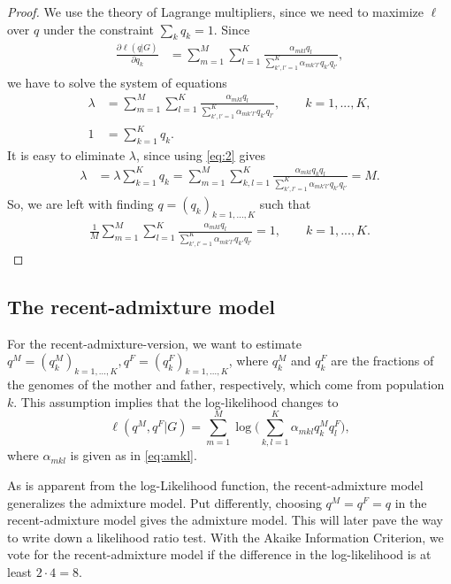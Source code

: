 \documentclass[12pt]{article}
\theoremstyle{definition}
\begin{document}
\begin{proof}
  We use the theory of Lagrange multipliers, since we need to maximize
  $\ell$ over $q$ under the constraint $\sum_k q_k=1$.
  Since
  \begin{align*}
    \frac{\partial \ell(q|G)}{\partial q_k} & = \sum_{m=1}^M \sum_{l=1}^K \frac{\alpha_{mkl}q_l}{\sum_{k',l'=1}^K
                                              \alpha_{mk'l'}q_{k'}q_{l'}},
  \end{align*}
  we have to solve the system of equations
  \begin{align}\label{eq:1}
    \lambda & = \sum_{m=1}^M \sum_{l=1}^K \frac{\alpha_{mkl}q_l}{\sum_{k',l'=1}^K \alpha_{mk'l'}q_{k'}q_{l'}}, \qquad k=1,...,K,
    \\\label{eq:2}
    1 & = \sum_{k=1}^K q_k.
  \end{align}
  It is easy to eliminate $\lambda$, since using \eqref{eq:2} gives
  \begin{align*}
    \lambda & = \lambda \sum_{k=1}^K q_k = \sum_{m=1}^M \sum_{k,l=1}^K
              \frac{\alpha_{mkl}q_kq_l}{\sum_{k',l'=1}^K \alpha_{mk'l'}q_{k'}q_{l'}} = M.
  \end{align*}
  So, we are left with finding $q = (q_k)_{k=1,...,K}$ such that
  \begin{align}\label{eq:1}
    \frac{1}{M}\sum_{m=1}^M \sum_{l=1}^K \frac{\alpha_{mkl}q_l}{\sum_{k',l'=1}^K \alpha_{mk'l'}q_{k'}q_{l'}} = 1, \qquad k=1,...,K.
  \end{align}
\end{proof}


\subsection{The recent-admixture model}
\noindent
For the recent-admixture-version, we want to estimate
$q^M=(q^M_{k})_{k=1,...,K}, q^F=(q^F_{k})_{k=1,...,K}$, where
$q^M_{k}$ and $q^F_k$ are the fractions of the genomes of the mother
and father, respectively, which come from population $k$.  This
assumption implies that the log-likelihood changes to
$$ \ell(q^M, q^F|G) = \sum_{m=1}^M  \log\Big(\sum_{k,l=1}^K \alpha_{mkl}q_{k}^M q_l^F\Big),$$
where $\alpha_{mkl}$ is given as in \eqref{eq:amkl}.

As is apparent from the log-Likelihood function, the recent-admixture
model generalizes the admixture model. Put differently, choosing
$q^M = q^F = q$ in the recent-admixture model gives the admixture
model. This will later pave the way to write down a likelihood ratio
test. With the Akaike Information Criterion, we vote for the
recent-admixture model if the difference in the log-likelihood is at
least $2\cdot 4 = 8.$
\end{document}

